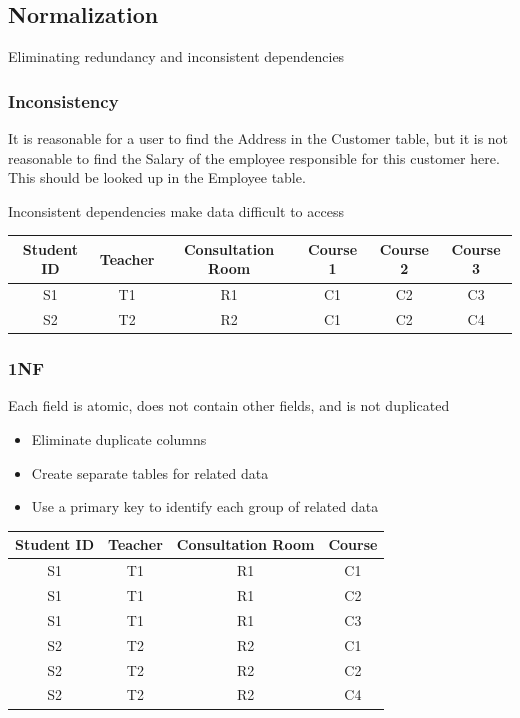 \documentclass[11pt,journal,compsoc]{IEEEtran}
\begin{document}
\subsection{Normalization}

Eliminating redundancy and inconsistent dependencies


\subsubsection{Inconsistency}

It is reasonable for a user to find the Address in the Customer table,
but it is not reasonable to find the Salary of the employee responsible for this customer here.
This should be looked up in the Employee table.

Inconsistent dependencies make data difficult to access

\begin{table}[H]
    \centering
    \begin{tabular}{|c|c|c|c|c|c|}
        \hline
        Student ID & Teacher & Consultation Room & Course 1 & Course 2 & Course 3 \\
        \hline
        S1 & T1 & R1 & C1 & C2 & C3 \\
        \hline
        S2 & T2 & R2 & C1 & C2 & C4 \\
        \hline
    \end{tabular}
\end{table}


\subsubsection{1NF}

Each field is atomic, does not contain other fields, and is not duplicated

\begin{itemize}
    \item Eliminate duplicate columns
    \item Create separate tables for related data
    \item Use a primary key to identify each group of related data
\end{itemize}

\begin{table}[H]
    \centering
    \begin{tabular}{|c|c|c|c|}
        \hline
        Student ID & Teacher & Consultation Room & Course \\
        \hline
        S1 & T1 & R1 & C1 \\
        \hline
        S1 & T1 & R1 & C2 \\
        \hline
        S1 & T1 & R1 & C3 \\
        \hline
        S2 & T2 & R2 & C1 \\
        \hline
        S2 & T2 & R2 & C2 \\
        \hline
        S2 & T2 & R2 & C4 \\
        \hline
    \end{tabular}
\end{table}
\end{document}
